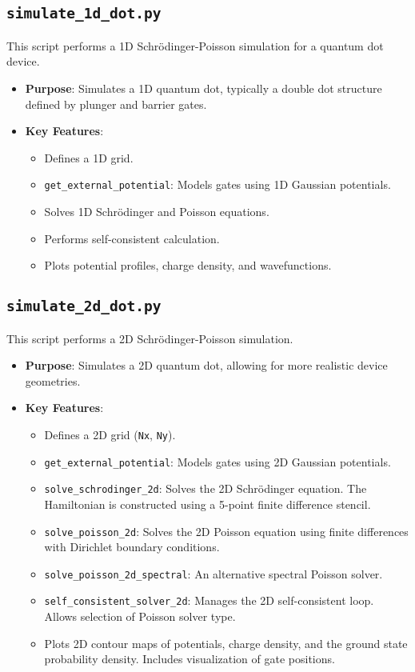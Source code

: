 \documentclass{article}
\begin{document}
\subsection{\texttt{simulate\_1d\_dot.py}}
This script performs a 1D Schrödinger-Poisson simulation for a quantum dot device.
\begin{itemize}
    \item \textbf{Purpose}: Simulates a 1D quantum dot, typically a double dot structure defined by plunger and barrier gates.
    \item \textbf{Key Features}:
        \begin{itemize}
            \item Defines a 1D grid.
            \item \texttt{get\_external\_potential}: Models gates using 1D Gaussian potentials.
            \item Solves 1D Schrödinger and Poisson equations.
            \item Performs self-consistent calculation.
            \item Plots potential profiles, charge density, and wavefunctions.
        \end{itemize}
\end{itemize}

\subsection{\texttt{simulate\_2d\_dot.py}}
This script performs a 2D Schrödinger-Poisson simulation.
\begin{itemize}
    \item \textbf{Purpose}: Simulates a 2D quantum dot, allowing for more realistic device geometries.
    \item \textbf{Key Features}:
        \begin{itemize}
            \item Defines a 2D grid (\texttt{Nx}, \texttt{Ny}).
            \item \texttt{get\_external\_potential}: Models gates using 2D Gaussian potentials.
            \item \texttt{solve\_schrodinger\_2d}: Solves the 2D Schrödinger equation. The Hamiltonian is constructed using a 5-point finite difference stencil.
            \item \texttt{solve\_poisson\_2d}: Solves the 2D Poisson equation using finite differences with Dirichlet boundary conditions.
            \item \texttt{solve\_poisson\_2d\_spectral}: An alternative spectral Poisson solver.
            \item \texttt{self\_consistent\_solver\_2d}: Manages the 2D self-consistent loop. Allows selection of Poisson solver type.
            \item Plots 2D contour maps of potentials, charge density, and the ground state probability density. Includes visualization of gate positions.
        \end{itemize}
\end{itemize}
\end{document}
